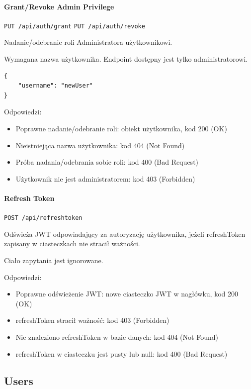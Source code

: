 \documentclass[a4paper,twoside,12pt]{book}
\begin{document}
\paragraph{Grant/Revoke Admin Privilege}

\texttt{PUT /api/auth/grant} \texttt{PUT /api/auth/revoke}

Nadanie/odebranie roli Administratora użytkownikowi.

Wymagana nazwa użytkownika. Endpoint dostępny jest tylko administratorowi.

\begin{verbatim}
{
    "username": "newUser"
}
\end{verbatim}

Odpowiedzi: 
\begin{itemize}
	\item Poprawne nadanie/odebranie roli: obiekt użytkownika, kod 200 (OK) 
	\item Nieistniejąca nazwa użytkownika: kod 404 (Not Found) 
	\item Próba nadania/odebrania sobie roli: kod 400 (Bad Request) 
	\item Użytkownik nie jest administratorem: kod 403 (Forbidden)
\end{itemize}


\paragraph{Refresh Token}

\texttt{POST /api/refreshtoken}

Odświeża JWT odpowiadający za autoryzację użytkownika, jeżeli refreshToken zapisany w ciasteczkach nie stracił ważności.

Ciało zapytania jest ignorowane.

Odpowiedzi: 
\begin{itemize}
	\item Poprawne odświeżenie JWT: nowe ciasteczko JWT w nagłówku, kod 200 (OK) 
	\item refreshToken stracił ważność: kod 403 (Forbidden) 
	\item Nie znaleziono refreshToken w bazie danych: kod 404 (Not Found)
	\item refreshToken w ciasteczku jest pusty lub null: kod 400 (Bad Request)
\end{itemize}


\subsection{Users}
\end{document}
